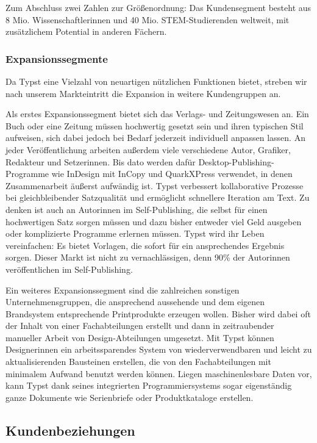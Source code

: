 \documentclass[11pt, a4paper]{article}
\newcommand{\gender}{\raisebox{-.25em}{*}}
\newcommand{\cited}[1]{\marginsymbol{$\nearrow$ #1}}
\newcommand{\marginsymbol}[1] {\protect\marginsymbolhelper{#1}}
\newcommand{\marginsymbolhelper}[1] {\tabto*{-1cm}\makebox[0cm]{#1}\tabto*{\TabPrevPos}}
\begin{document}
Zum Abschluss zwei Zahlen zur Größenordnung: Das Kundensegment besteht aus \cited{7}8 Mio. Wissenschaftler\gender{}innen und \cited{8}40 Mio. STEM-Studierenden weltweit, mit zusätzlichem Potential in anderen Fächern.

\subsubsection*{Expansionssegmente}

Da Typst eine Vielzahl von neuartigen nützlichen Funktionen bietet, streben wir nach unserem Markteintritt die Expansion in weitere Kundengruppen an.

Als erstes Expansionssegment bietet sich das Verlags- und Zeitungswesen an. Ein Buch oder eine Zeitung müssen hochwertig gesetzt sein und ihren typischen Stil aufweisen, sich dabei jedoch bei Bedarf jederzeit individuell anpassen lassen. An jeder Veröffentlichung arbeiten außerdem viele verschiedene Autor\gender{}, Grafiker\gender{}, Redakteur\gender{} und Setzer\gender{}innen. Bis dato werden dafür Desktop-Publishing-Programme wie InDesign mit InCopy und QuarkXPress verwendet, in denen Zusammenarbeit äußerst aufwändig ist. Typst verbessert kollaborative Prozesse bei gleichbleibender Satzqualität und ermöglicht schnellere Iteration am Text. Zu denken ist auch an Autor\gender{}innen im Self-Publishing, die selbst für einen hochwertigen Satz sorgen müssen und dazu bisher entweder viel Geld ausgeben oder komplizierte Programme erlernen müssen. Typst wird ihr Leben vereinfachen: Es bietet Vorlagen, die sofort für ein ansprechendes Ergebnis sorgen. Dieser Markt ist nicht zu vernachlässigen, denn \cited{9} 90\% der Autor\gender{}innen veröffentlichen im Self-Publishing.


Ein weiteres Expansionssegment sind die zahlreichen sonstigen Unternehmensgruppen, die ansprechend aussehende und dem eigenen Brandsystem entsprechende Printprodukte erzeugen wollen. Bisher wird dabei oft der Inhalt von einer Fachabteilungen erstellt und dann in zeitraubender manueller Arbeit von Design-Abteilungen umgesetzt. Mit Typst können Designer\gender{}innen ein arbeitssparendes System von wiederverwendbaren und leicht zu aktualisierenden Bausteinen erstellen, die von den Fachabteilungen mit minimalem Aufwand benutzt werden können. Liegen maschinenlesbare Daten vor, kann Typst dank seines integrierten Programmiersystems sogar eigenständig ganze Dokumente wie Serienbriefe oder Produktkataloge erstellen.

\newpage
\subsection*{Kundenbeziehungen}
\end{document}
